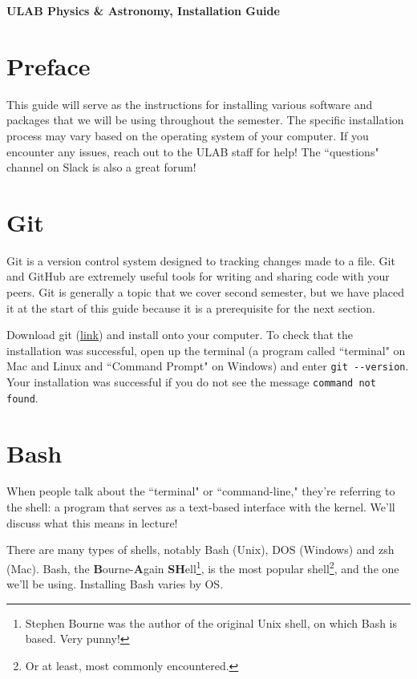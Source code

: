 \documentclass[12pt]{article}
\numberwithin{equation}{section}
\begin{document}
	\begin{center}
			\textbf{\Large{ULAB Physics \& Astronomy, Installation Guide}}
	\end{center}

	\tableofcontents

	\section{Preface}
	
	This guide will serve as the instructions for installing various software and packages that we will be using throughout the semester. The specific installation process may vary based on the operating system of your computer. If you encounter any issues, reach out to the ULAB staff for help! The ``questions" channel on Slack is also a great forum!
	
	\section{Git}
	
	Git is a version control system designed to tracking changes made to a file. Git and GitHub are extremely useful tools for writing and sharing code with your peers. Git is generally a topic that we cover second semester, but we have placed it at the start of this guide because it is a prerequisite for the next section.
	
	Download git (\hyperref{https://git-scm.com/downloads}{}{}{link}) and install onto your computer. To check that the installation was successful, open up the terminal (a program called ``terminal" on Mac and Linux and ``Command Prompt" on Windows) and enter \verb|git --version|. Your installation was successful if you do not see the message \verb|command not found|.
	
	\section{Bash}
	
	When people talk about the ``terminal" or ``command-line," they're referring to the shell: a program that serves as a text-based interface with the kernel. We'll discuss what this means in lecture! 
	
	There are many types of shells, notably Bash (Unix), DOS (Windows) and zsh (Mac). Bash, the \textbf{B}ourne-\textbf{A}gain \textbf{SH}ell\footnote{Stephen Bourne was the author of the original Unix shell, on which Bash is based. Very punny!}, is the most popular shell\footnote{Or at least, most commonly encountered.}, and the one we'll be using. Installing Bash varies by OS.
	
\end{document}
